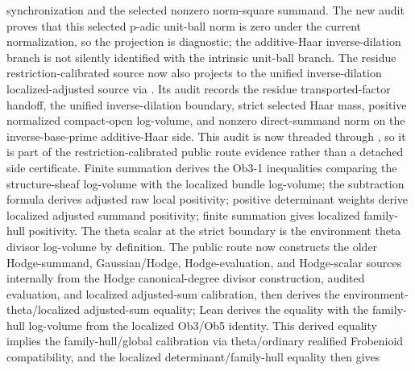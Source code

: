 \begin{proposition}
  synchronization and the selected nonzero norm-square summand.  The new
  audit proves that this selected p-adic unit-ball norm is zero under the
  current normalization, so the projection is diagnostic; the additive-Haar
  inverse-dilation branch is not silently identified with the intrinsic
  unit-ball branch.
  The residue restriction-calibrated source now also projects to the unified
  inverse-dilation localized-adjusted source via
  .
  Its audit
  records the residue transported-factor handoff, the unified inverse-dilation
  boundary, strict selected Haar mass, positive normalized compact-open
  log-volume, and nonzero direct-summand norm on the inverse-base-prime
  additive-Haar side.  This audit is now threaded through
  ,
  so it is part of the restriction-calibrated public route evidence rather
  than a detached side certificate.
  Finite
  summation derives the Ob3-1 inequalities comparing the structure-sheaf
  log-volume with the localized bundle log-volume; the subtraction formula
  derives adjusted raw local positivity; positive determinant weights derive
  localized adjusted summand positivity; finite summation gives localized
  family-hull positivity.  The theta scalar at the strict boundary is the
  environment theta divisor log-volume by definition.  The public route now
  constructs the older Hodge-summand, Gaussian/Hodge, Hodge-evaluation, and
  Hodge-scalar sources internally from the Hodge canonical-degree divisor
  construction, audited evaluation, and localized adjusted-sum calibration,
  then derives the
  environment-theta/localized adjusted-sum equality; Lean derives the equality
  with the family-hull log-volume from the localized Ob3/Ob5 identity.  This
  derived equality implies the
  family-hull/global calibration via theta/ordinary realified Frobenioid
  compatibility, and the localized determinant/family-hull equality then gives

\end{proposition}
